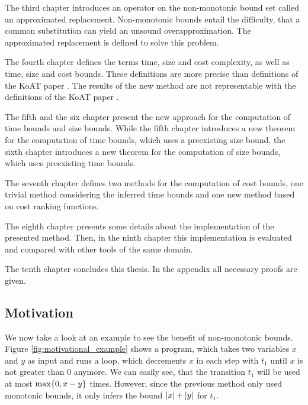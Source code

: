 The third chapter introduces an operator on the non-monotonic bound set called an approximated replacement.
Non-monotonic bounds entail the difficulty, that a common substitution can yield an unsound overapproximation.
The approximated replacement is defined to solve this problem.

The fourth chapter defines the terms time, size and cost complexity, as well as time, size and cost bounds.
These definitions are more precise than definitions of the KoAT paper \cite{koat}.
The results of the new method are not representable with the definitions of the KoAT paper \cite{koat}.

The fifth and the six chapter present the new approach for the computation of time bounds and size bounds.
While the fifth chapter introduces a new theorem for the computation of time bounds, which uses a preexisting size bound, the sixth chapter introduces a new theorem for the computation of size bounds, which uses preexisting time bounds.

The seventh chapter defines two methods for the computation of cost bounds, one trivial method considering the inferred time bounds and one new method based on cost ranking functions.

The eighth chapter presents some details about the implementation of the presented method.
Then, in the ninth chapter this implementation is evaluated and compared with other tools of the same domain.

The tenth chapter concludes this thesis.
In the appendix all necessary proofs are given.

\subsection{Motivation}

We now take a look at an example to see the benefit of non-monotonic bounds.
Figure \ref{fig:motivational_example} shows a program, which takes two variables $x$ and $y$ as input and runs a loop, which decrements $x$ in each step with $t_1$ until $x$ is not greater than 0 anymore.
We can easily see, that the transition $t_1$ will be used at most $\max \lbrace 0, x-y \rbrace$ times.
However, since the previous method only used monotonic bounds, it only infers the bound $\left|x\right|+\left|y\right|$ for $t_1$.





